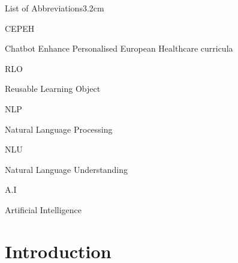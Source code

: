 \documentclass[a4paper, nobind]{templates/ociamthesis}
\begin{document}
\begin{romanpages}
\flushbottom

\tableofcontents

\listoffigures
	\mtcaddchapter

\listoftables
  \mtcaddchapter
\begin{mclistof}{List of Abbreviations}{3.2cm}

\item[CEPEH]

Chatbot Enhance Personalised European Healthcare curricula

\item[RLO]

Reusable Learning Object

\item[NLP]

Natural Language Processing

\item[NLU]

Natural Language Understanding

\item[A.I]

Artificial Intelligence

\end{mclistof} 


\end{romanpages}

\flushbottom

\hypertarget{introduction}{%
\chapter*{Introduction}\label{introduction}}
\end{document}

